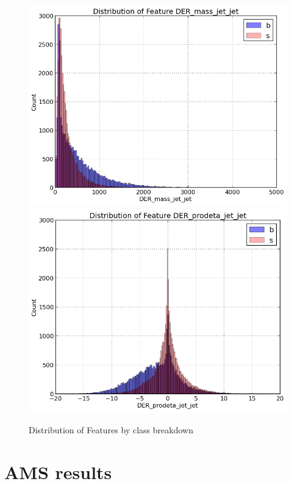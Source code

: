 \documentclass[final,3p,times,onecolumn]{elsarticle}
\begin{document}
\begin{figure}
\hspace{-0.5cm}
\includegraphics[scale=0.5]{Images/DER_mass_jet_jet_Hist.png}
\hspace{4mm}
\includegraphics[scale=0.5]{Images/DER_prodeta_jet_jet_Hist.png}
\caption{Distribution of Features by class breakdown}
\label{dists_2}
\end{figure} 

\section{AMS results}
 
\end{document}
